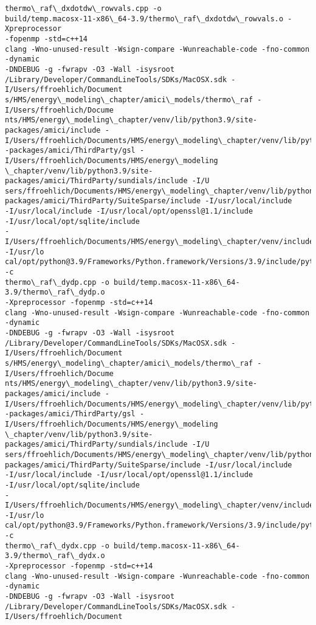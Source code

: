 \documentclass[11pt]{article}
\begin{document}
\begin{Verbatim}[commandchars=\\\{\}]
thermo\_raf\_dxdotdw\_rowvals.cpp -o
build/temp.macosx-11-x86\_64-3.9/thermo\_raf\_dxdotdw\_rowvals.o -Xpreprocessor
-fopenmp -std=c++14
clang -Wno-unused-result -Wsign-compare -Wunreachable-code -fno-common -dynamic
-DNDEBUG -g -fwrapv -O3 -Wall -isysroot
/Library/Developer/CommandLineTools/SDKs/MacOSX.sdk -I/Users/ffroehlich/Document
s/HMS/energy\_modeling\_chapter/amici\_models/thermo\_raf -I/Users/ffroehlich/Docume
nts/HMS/energy\_modeling\_chapter/venv/lib/python3.9/site-packages/amici/include -
I/Users/ffroehlich/Documents/HMS/energy\_modeling\_chapter/venv/lib/python3.9/site
-packages/amici/ThirdParty/gsl -I/Users/ffroehlich/Documents/HMS/energy\_modeling
\_chapter/venv/lib/python3.9/site-packages/amici/ThirdParty/sundials/include -I/U
sers/ffroehlich/Documents/HMS/energy\_modeling\_chapter/venv/lib/python3.9/site-
packages/amici/ThirdParty/SuiteSparse/include -I/usr/local/include
-I/usr/local/include -I/usr/local/opt/openssl@1.1/include
-I/usr/local/opt/sqlite/include
-I/Users/ffroehlich/Documents/HMS/energy\_modeling\_chapter/venv/include -I/usr/lo
cal/opt/python@3.9/Frameworks/Python.framework/Versions/3.9/include/python3.9 -c
thermo\_raf\_dydp.cpp -o build/temp.macosx-11-x86\_64-3.9/thermo\_raf\_dydp.o
-Xpreprocessor -fopenmp -std=c++14
clang -Wno-unused-result -Wsign-compare -Wunreachable-code -fno-common -dynamic
-DNDEBUG -g -fwrapv -O3 -Wall -isysroot
/Library/Developer/CommandLineTools/SDKs/MacOSX.sdk -I/Users/ffroehlich/Document
s/HMS/energy\_modeling\_chapter/amici\_models/thermo\_raf -I/Users/ffroehlich/Docume
nts/HMS/energy\_modeling\_chapter/venv/lib/python3.9/site-packages/amici/include -
I/Users/ffroehlich/Documents/HMS/energy\_modeling\_chapter/venv/lib/python3.9/site
-packages/amici/ThirdParty/gsl -I/Users/ffroehlich/Documents/HMS/energy\_modeling
\_chapter/venv/lib/python3.9/site-packages/amici/ThirdParty/sundials/include -I/U
sers/ffroehlich/Documents/HMS/energy\_modeling\_chapter/venv/lib/python3.9/site-
packages/amici/ThirdParty/SuiteSparse/include -I/usr/local/include
-I/usr/local/include -I/usr/local/opt/openssl@1.1/include
-I/usr/local/opt/sqlite/include
-I/Users/ffroehlich/Documents/HMS/energy\_modeling\_chapter/venv/include -I/usr/lo
cal/opt/python@3.9/Frameworks/Python.framework/Versions/3.9/include/python3.9 -c
thermo\_raf\_dydx.cpp -o build/temp.macosx-11-x86\_64-3.9/thermo\_raf\_dydx.o
-Xpreprocessor -fopenmp -std=c++14
clang -Wno-unused-result -Wsign-compare -Wunreachable-code -fno-common -dynamic
-DNDEBUG -g -fwrapv -O3 -Wall -isysroot
/Library/Developer/CommandLineTools/SDKs/MacOSX.sdk -I/Users/ffroehlich/Document

\end{Verbatim}
\end{document}
